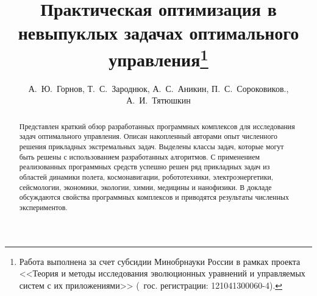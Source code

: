 \usepackage{todonotes} 

\usepackage[russian]{nla}


\fi

\title{Практическая оптимизация в невыпуклых задачах оптимального управления\thanks{
	Работа выполнена за счет субсидии Минобрнауки России в рамках проекта <<Теория и методы исследования эволюционных уравнений и управляемых систем с их приложениями>> (\textnumero~гос. регистрации: 121041300060-4).}}
\author{А.~Ю.~Горнов, Т.~С.~Зароднюк, А.~С.~Аникин, П.~С.~Сороковиков., А.~И.~Тятюшкин}


\maketitle

\begin{abstract}
Представлен краткий обзор разработанных программных комплексов для исследования задач оптимального управления. Описан накопленный авторами опыт численного решения прикладных экстремальных задач. Выделены классы задач, которые могут быть решены с использованием разработанных алгоритмов. С применением реализованных программных средств успешно решен ряд прикладных задач из областей динамики полета, космонавигации, робототехники, электроэнергетики, сейсмологии, экономики, экологии, химии, медицины и нанофизики. В докладе обсуждаются свойства программных комплексов и приводятся результаты численных экспериментов.

\end{abstract}

